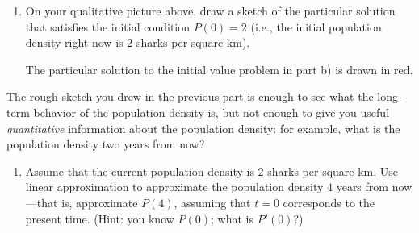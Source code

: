 \documentclass[main]{subfiles}
\begin{document}
\begin{enumerate}
\begin{enumerate}
\begin{solution}


    
    
  \end{solution}
    
  \item
  \begin{problem}
    On your qualitative picture above, draw a sketch of the particular solution that 
    satisfies the initial condition $P(0)=2$ (i.e., the initial
    population density right now is $2$ sharks per square km).
  \end{problem}


  \begin{solution}
    The particular solution to the initial value problem in part b) is drawn in red.
  \end{solution}

  
\end{enumerate}
    
The rough sketch you drew in the previous part is enough to see what the long-term behavior of 
the population density is, but not enough to give
you useful \emph{quantitative} information about the population density: for example, what is the population density two years from now?
  
\begin{enumerate}[resume]
    
  \item \label{qualitative-linear-approx-at-2}
  \begin{problem}[1.5in]
    Assume that the current population density is $2$ sharks per square km.  
    Use linear approximation to approximate the population density $4$ years 
    from now---that is, approximate $P(4)$, assuming that $t = 0$ corresponds
    to the present time.  (Hint: you know $P(0)$; what is $P'(0)$?)
  \end{problem}
    

\end{enumerate}
\end{enumerate}
\end{document}
